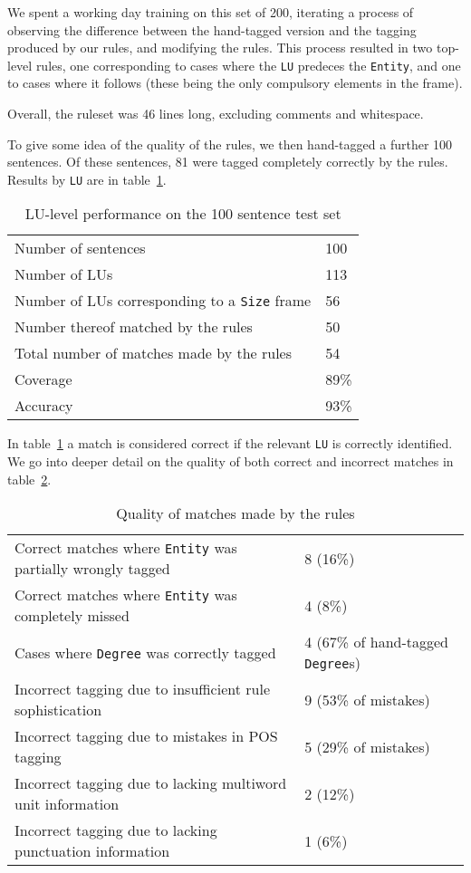 \documentclass{llncs}
\begin{document}
We spent a working day training on this set of 200, iterating a process
of observing the difference between the hand-tagged version and the
tagging produced by our rules, and modifying the rules. This process resulted
in two top-level rules, one corresponding to cases where the \verb+LU+ predeces
the \verb+Entity+, and one to cases where it follows (these being the only
compulsory elements in the frame).

Overall, the ruleset was 46 lines long, excluding comments and whitespace.

To give some idea of the quality of the rules, we then hand-tagged a further 100 sentences.
Of these sentences, 81 were tagged completely correctly by the rules. Results by \verb+LU+ are in
table~\ref{luperf}.

\begin{table}[h]
  \centering
  \begin{tabular}{l | l}
    \hline
    Number of sentences & 100 \\
    Number of LUs & 113 \\
    Number of LUs corresponding to a \verb+Size+ frame & 56 \\ %
    Number thereof matched by the rules & 50 \\
    Total number of matches made by the rules & 54 \\
    \hline
    Coverage & 89\% \\
    Accuracy & 93\% \\
    \hline
  \end{tabular}
  \caption{LU-level performance on the 100 sentence test set}
  \label{luperf}
\end{table}

In table~\ref{luperf} a match is considered correct if the relevant \verb+LU+
is correctly identified. We go into deeper detail on the quality of both
correct and incorrect matches in table~\ref{framequality}.

\begin{table}[h]
  \centering
  \begin{tabular}{ l | l }
    \hline
    Correct matches where \verb+Entity+ was partially wrongly tagged & 8 (16\%) \\
    Correct matches where \verb+Entity+ was completely missed & 4 (8\%) \\
    Cases where \verb+Degree+ was correctly tagged & 4 (67\% of hand-tagged \verb+Degree+s) \\
    Incorrect tagging due to insufficient rule sophistication & 9 (53\% of mistakes) \\
    Incorrect tagging due to mistakes in POS tagging & 5 (29\% of mistakes) \\
    Incorrect tagging due to lacking multiword unit information & 2 (12\%) \\
    Incorrect tagging due to lacking punctuation information & 1 (6\%) \\
    \hline
  \end{tabular}
  \caption{Quality of matches made by the rules}
  \label{framequality}
\end{table}
\end{document}
